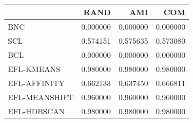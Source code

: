 \begin{tabular}{lrrr}
\toprule
 & RAND & AMI & COM \\
\midrule
BNC & 0.000000 & 0.000000 & 0.000000 \\
SCL & 0.574151 & 0.575635 & 0.573080 \\
BCL & 0.000000 & 0.000000 & 0.000000 \\
EFL-KMEANS & 0.980000 & 0.980000 & 0.980000 \\
EFL-AFFINITY & 0.662133 & 0.637450 & 0.666811 \\
EFL-MEANSHIFT & 0.960000 & 0.960000 & 0.960000 \\
EFL-HDBSCAN & 0.980000 & 0.980000 & 0.980000 \\
\bottomrule
\end{tabular}
